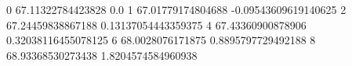 0 67.11322784423828 0.0
1 67.01779174804688 -0.09543609619140625
2 67.24459838867188 0.13137054443359375
4 67.43360900878906 0.32038116455078125
6 68.0028076171875 0.8895797729492188
8 68.93368530273438 1.8204574584960938
